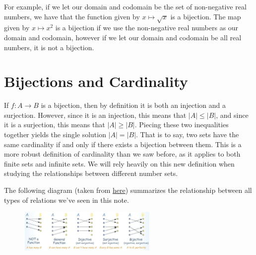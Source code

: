 \documentclass{article}
\begin{document}
For example, if we let our domain and codomain be the set of non-negative real 
numbers, we have that the function given by $x \mapsto \sqrt{x}$ is a bijection.
The map given by $x \mapsto x^2$ is a bijection if we use the non-negative real 
numbers as our domain and codomain, however if we let our domain and codomain be all real numbers, it is not a bijection.

\section{Bijections and Cardinality}

If $f: A \rightarrow B$ is a bijection, then by definition it is both an injection and a surjection. However, since it is an injection, this means that $|A| \leq |B|$, and since it is a surjection, this means that $|A| \geq |B|$. Piecing these two inequalities together yields the single solution $\boxed{|A| = |B|}$. That is to say, two sets have the same cardinality if and only if there exists a bijection between them. This is a more robust definition of cardinality than we saw before, as it applies to both finite sets and infinite sets. We will rely heavily on this new definition when studying the relationships between different number sets.

The following diagram (taken from 
\href{https://www.aplustopper.com/one-to-one-and-onto-functions/}{here}) 
summarizes the relationship between all types of relations we’ve seen in this note.

\begin{figure}[h]
\centering
\includegraphics[width=0.6\textwidth]{./images/typesoffunctions.png}
\label{fig:typesoffunctions}
\end{figure}
\end{document}
